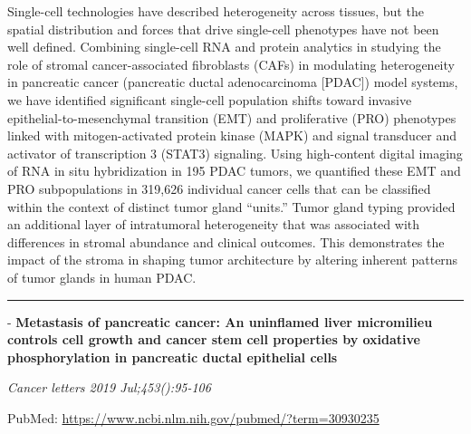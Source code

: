 \documentclass[]{article}
\begin{document}
Single-cell technologies have described heterogeneity across tissues,
but the spatial distribution and forces that drive single-cell
phenotypes have not been well defined. Combining single-cell RNA and
protein analytics in studying the role of stromal cancer-associated
fibroblasts (CAFs) in modulating heterogeneity in pancreatic cancer
(pancreatic ductal adenocarcinoma {[}PDAC{]}) model systems, we have
identified significant single-cell population shifts toward invasive
epithelial-to-mesenchymal transition (EMT) and proliferative (PRO)
phenotypes linked with mitogen-activated protein kinase (MAPK) and
signal transducer and activator of transcription 3 (STAT3) signaling.
Using high-content digital imaging of RNA in situ hybridization in 195
PDAC tumors, we quantified these EMT and PRO subpopulations in 319,626
individual cancer cells that can be classified within the context of
distinct tumor gland ``units.'' Tumor gland typing provided an
additional layer of intratumoral heterogeneity that was associated with
differences in stromal abundance and clinical outcomes. This
demonstrates the impact of the stroma in shaping tumor architecture by
altering inherent patterns of tumor glands in human PDAC.

{}

{}

\begin{center}\rule{0.5\linewidth}{\linethickness}\end{center}

 - \textbf{Metastasis of pancreatic cancer: An uninflamed liver
micromilieu controls cell growth and cancer stem cell properties by
oxidative phosphorylation in pancreatic ductal epithelial cells}

\emph{Cancer letters 2019 Jul;453():95-106}

PubMed: \url{https://www.ncbi.nlm.nih.gov/pubmed/?term=30930235}
\end{document}
